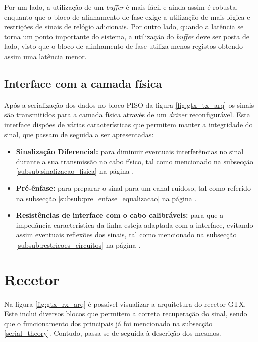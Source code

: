 Por um lado, a utilização de um \textit{buffer} é mais fácil e ainda assim é robusta, enquanto que o bloco de alinhamento de fase exige a utilização de mais lógica e restrições de sinais de relógio adicionais. Por outro lado, quando a latência se torna um ponto importante do sistema, a utilização do \textit{buffer} deve ser posta de lado, visto que o bloco de alinhamento de fase utiliza menos registos obtendo assim uma latência menor.

\subsection{Interface com a camada física} 
Após a serialização dos dados no bloco PISO da figura \ref{fig:gtx_tx_arq} os sinais são transmitidos para a camada física através de um \textit{driver} reconfigurável. Esta interface dispões de várias características que permitem manter a integridade do sinal, que passam de seguida a ser apresentadas:

\begin{itemize}
	\item \textbf{Sinalização Diferencial:} para diminuir eventuais interferências no sinal durante a sua transmissão no cabo físico, tal como mencionado na subsecção  \ref{subsub:sinalizacao_fisica} na página \pageref{subsub:sinalizacao_fisica}.
	
	\item \textbf{Pré-ênfase:} para preparar o sinal para um canal ruidoso, tal como referido na subsecção \ref{subsub:pre_enfase_equalizacao} na página \pageref{subsub:pre_enfase_equalizacao}.
	
	\item \textbf{Resistências de interface com o cabo calibráveis:} para que a impedância característica da linha esteja adaptada com a interface, evitando assim eventuais reflexões dos sinais, tal como mencionado na subsecção \ref{subsub:restricoes_circuitos} na página \pageref{subsub:restricoes_circuitos}.
\end{itemize}


\section{Recetor} \label{sec:_rx_gtx}
Na figura \ref{fig:gtx_rx_arq} é possível visualizar a arquitetura do recetor GTX. Este inclui diversos blocos que permitem a correta recuperação do sinal, sendo que o funcionamento dos principais já foi mencionado na subsecção \ref{serial_theory}. Contudo, passa-se de seguida à descrição dos mesmos.

